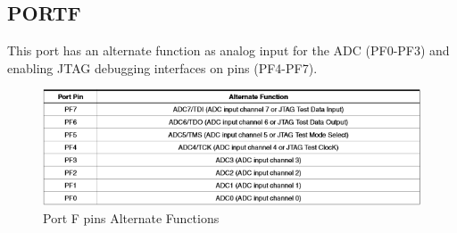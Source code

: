 \documentclass[english]{article}
\begin{document}
\subsection{PORTF}
This port has an alternate function as analog input for the ADC (PF0-PF3) and enabling JTAG debugging interfaces on pins (PF4-PF7).
\begin{figure}[H]
\caption{Port F pins Alternate Functions}
\centerline{\includegraphics[scale=0.8]{MicroLab1/pictures/4}}
\end{figure}
\end{document}
